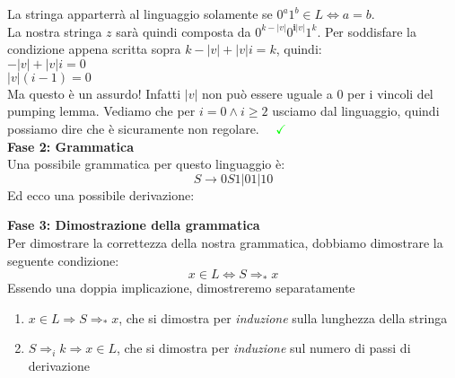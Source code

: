 \documentclass[a4paper,oneside]{scrbook}
\newcommand{\greenmark}{\quad \textcolor{green}{\checkmark}}
\newcommand{\blue}[1]{\textcolor{blue}{#1}}
\begin{document}
La stringa apparterrà al linguaggio solamente se $0^a1^b\in L \Leftrightarrow a=b$.\\
La nostra stringa $z$ sarà quindi composta da $0^{k-|v|}0^{\textbf{i}|v|}1^k$. Per soddisfare la condizione appena scritta sopra $k-|v|+|v|i=k$, quindi:\\
$-|v|+|v|i=0$\\
$|v|(i-1)=0$\\
Ma questo è un assurdo! Infatti $|v|$ non può essere uguale a $0$ per i vincoli del pumping lemma.
Vediamo che per $i=0 \wedge i\geq2$ usciamo dal linguaggio, quindi possiamo dire che è sicuramente non regolare. $\greenmark$\\
\textbf{Fase 2: Grammatica}\\
Una possibile grammatica per questo linguaggio è:
$$S \rightarrow 0S1|01|10$$
Ed ecco una possibile derivazione:
\begin{center}
\end{center}
\textbf{Fase 3: Dimostrazione della grammatica}\\
Per dimostrare la correttezza della nostra grammatica, dobbiamo dimostrare la seguente condizione:
$$x\in L \Leftrightarrow S \Rightarrow_* x$$
Essendo una doppia implicazione, dimostreremo separatamente
\begin{enumerate}
	\item $x\in L \Rightarrow S \Rightarrow_* x $, che si dimostra per \textit{induzione} sulla lunghezza della stringa
	\item $ S \Rightarrow_i k \Rightarrow x \in L$, che si dimostra per \textit{induzione} sul numero di passi di derivazione
\end{enumerate}
\end{document}
